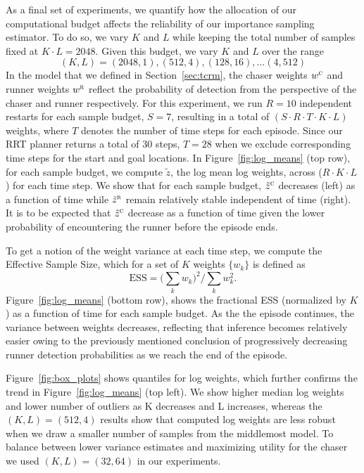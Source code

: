 \documentclass[twoside]{article}
\begin{document}
As a final set of experiments, we quantify how the allocation of our computational budget affects the reliability of our importance sampling estimator. To do so, we vary $K$ and $L$ while keeping the total number of samples fixed at $K \cdot L = 2048$. Given this budget, we vary $K$ and $L$ over the range
\vskip -0.3in
\[
    (K,L) = (2048,1), (512, 4), (128, 16), \ldots (4,512)
\]
\vskip -0.1in
In the model that we defined in Section~\ref{sec:tcrm}, the chaser weights $w^\textsc{c}$ and runner weights $w^\textsc{r}$ reflect the probability of detection from the perspective of the chaser and runner respectively.
%
For this experiment, we run $R=10$ independent restarts for each sample budget, $S=7$, resulting in a total of $(S \cdot R \cdot T \cdot K  \cdot L)$ weights, where $T$ denotes the number of time steps for each episode. Since our RRT planner returns a total of 30 steps, $T= 28$ when we exclude corresponding time steps for the start and goal locations. In Figure~\ref{fig:log_means} (top row), for each sample budget, we compute
$\tilde{z}$, the log mean log weights, across ($R \cdot K \cdot L$) for each time step. We show that for each sample budget, $\tilde{z}^\textsc{c}$ decreases (left) as a function of time while $\tilde{z}^\textsc{r}$ remain relatively stable independent of time (right).  It is to be expected that $\tilde{z}^\textsc{c}$ decrease as a function of time given the lower probability of encountering the runner before the episode ends.

To get a notion of the weight variance at each time step, we compute the Effective Sample Size, which for a set of $K$ weights $\{w_k\}$ is defined as 
\vskip -0.1in
\[
    \textstyle \text{ESS} = \Big(\sum_k w_k \Big)^2 / \sum_k w_k^2.
\]
Figure~\ref{fig:log_means} (bottom row), shows the fractional ESS (normalized by $K$) as a function of time for each sample budget. As the the episode continues, the variance between weights decreases, reflecting that inference becomes relatively easier owing to the previously mentioned conclusion of progressively decreasing runner detection probabilities as we reach the end of the episode.

Figure~\ref{fig:box_plots} shows quantiles for log weights, which further confirms the trend in Figure~\ref{fig:log_means} (top left). We show higher median log weights and lower number of outliers as K decreases and L increases, whereas the $(K,L)=(512,4)$ results show that computed log weights are less robust when we draw a smaller number of samples from the middlemost model. To balance between lower variance estimates and maximizing utility for the chaser we used $(K,L)=(32,64)$ in our experiments. 
\end{document}

